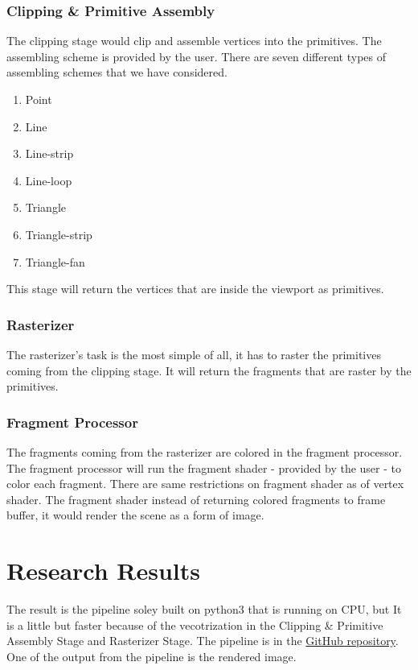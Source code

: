 \documentclass[a4paper]{article}
\theoremstyle{mytheoremstyle}
\theoremstyle{mytheoremstyle}
\theoremstyle{myproblemstyle}
\begin{document}
\subsubsection{Clipping \& Primitive Assembly}
The clipping stage would clip and assemble vertices into the primitives. The assembling scheme is provided by the user. There are seven different types of assembling schemes that we have considered.
\begin{enumerate}
    \item Point
    \item Line
    \item Line-strip
    \item Line-loop
    \item Triangle
    \item Triangle-strip
    \item Triangle-fan
\end{enumerate}

This stage will return the vertices that are inside the viewport as primitives.

\subsubsection{Rasterizer}
The rasterizer's task is the most simple of all, it has to raster the primitives coming from the clipping stage. It will return the fragments that are raster by the primitives.

\subsubsection{Fragment Processor}
The fragments coming from the rasterizer are colored in the fragment processor. The fragment processor will run the fragment shader - provided by the user -  to color each fragment. There are same restrictions on fragment shader as of vertex shader. The fragment shader instead of returning colored fragments to frame buffer, it would render the scene as a form of image.

\section{Research Results}
The result is the pipeline soley built on python3 that is running on CPU, but It is a little but faster because of the vecotrization in the Clipping \& Primitive Assembly Stage and Rasterizer Stage. The pipeline is in the \href{https://GitHub.com/ai-maq/Computer-Graphics-Tehqiq/}{GitHub repository}. One of the output from the pipeline is the rendered image.
\end{document}
